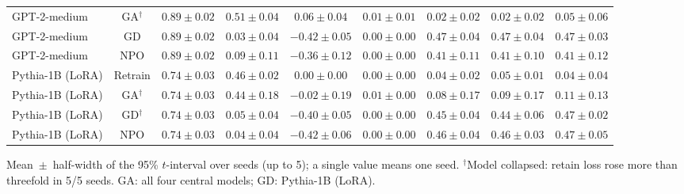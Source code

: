 \begin{table}[t]
\begin{tabular*}{\textwidth}{@{\extracolsep{\fill}}lcccccccc@{}}
GPT-2-medium & GA$^{\dagger}$ & $0.89 \pm 0.02$ & $0.51 \pm 0.04$ & $0.06 \pm 0.04$ & $0.01 \pm 0.01$ & $0.02 \pm 0.02$ & $0.02 \pm 0.02$ & $0.05 \pm 0.06$ \\
GPT-2-medium & GD & $0.89 \pm 0.02$ & $0.03 \pm 0.04$ & $-0.42 \pm 0.05$ & $0.00 \pm 0.00$ & $0.47 \pm 0.04$ & $0.47 \pm 0.04$ & $0.47 \pm 0.03$ \\
GPT-2-medium & NPO & $0.89 \pm 0.02$ & $0.09 \pm 0.11$ & $-0.36 \pm 0.12$ & $0.00 \pm 0.00$ & $0.41 \pm 0.11$ & $0.41 \pm 0.10$ & $0.41 \pm 0.12$ \\
Pythia-1B (LoRA) & Retrain & $0.74 \pm 0.03$ & $0.46 \pm 0.02$ & $0.00 \pm 0.00$ & $0.00 \pm 0.00$ & $0.04 \pm 0.02$ & $0.05 \pm 0.01$ & $0.04 \pm 0.04$ \\
Pythia-1B (LoRA) & GA$^{\dagger}$ & $0.74 \pm 0.03$ & $0.44 \pm 0.18$ & $-0.02 \pm 0.19$ & $0.01 \pm 0.00$ & $0.08 \pm 0.17$ & $0.09 \pm 0.17$ & $0.11 \pm 0.13$ \\
Pythia-1B (LoRA) & GD$^{\dagger}$ & $0.74 \pm 0.03$ & $0.05 \pm 0.04$ & $-0.40 \pm 0.05$ & $0.00 \pm 0.00$ & $0.45 \pm 0.04$ & $0.44 \pm 0.06$ & $0.47 \pm 0.02$ \\
Pythia-1B (LoRA) & NPO & $0.74 \pm 0.03$ & $0.04 \pm 0.04$ & $-0.42 \pm 0.06$ & $0.00 \pm 0.00$ & $0.46 \pm 0.04$ & $0.46 \pm 0.03$ & $0.47 \pm 0.05$ \\
\bottomrule
\end{tabular*}

\smallskip
{\footnotesize Mean~$\pm$~half-width of the 95\% $t$-interval over seeds (up to 5); a single value means one seed. $^{\dagger}$Model collapsed: retain loss rose more than threefold in 5/5 seeds. GA: all four central models; GD: Pythia-1B (LoRA).\par}
\end{table}
